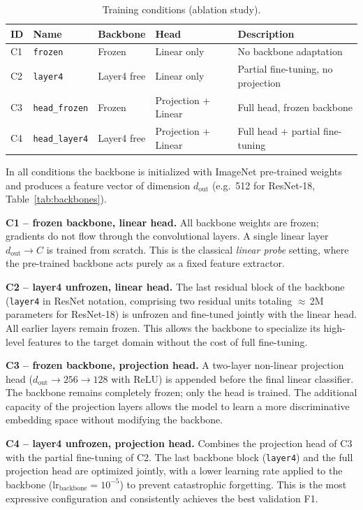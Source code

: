 \documentclass[12pt, a4paper]{article}
\begin{document}
\begin{table}[h]
\centering
\caption{Training conditions (ablation study).}
\label{tab:conditions}
\begin{tabular}{llllL{4cm}}
\toprule
\textbf{ID} & \textbf{Name} & \textbf{Backbone} & \textbf{Head} &
\textbf{Description} \\
\midrule
C1 & \texttt{frozen}       & Frozen      & Linear only         & No backbone adaptation \\
C2 & \texttt{layer4}       & Layer4 free & Linear only         & Partial fine-tuning, no projection \\
C3 & \texttt{head\_frozen} & Frozen      & Projection + Linear & Full head, frozen backbone \\
C4 & \texttt{head\_layer4} & Layer4 free & Projection + Linear & Full head + partial fine-tuning \\
\bottomrule
\end{tabular}
\end{table}

In all conditions the backbone is initialized with ImageNet pre-trained weights
and produces a feature vector of dimension $d_\text{out}$ (e.g.\ 512 for
ResNet-18, Table~\ref{tab:backbones}).

\textbf{C1 -- frozen backbone, linear head.}
All backbone weights are frozen; gradients do not flow through the convolutional
layers.
A single linear layer $d_\text{out} \to C$ is trained from scratch.
This is the classical \emph{linear probe} setting, where the pre-trained backbone
acts purely as a fixed feature extractor.

\textbf{C2 -- layer4 unfrozen, linear head.}
The last residual block of the backbone (\texttt{layer4} in ResNet notation,
comprising two residual units totaling $\approx$\,2M parameters for ResNet-18)
is unfrozen and fine-tuned jointly with the linear head.
All earlier layers remain frozen.
This allows the backbone to specialize its high-level features to the target
domain without the cost of full fine-tuning.

\textbf{C3 -- frozen backbone, projection head.}
A two-layer non-linear projection head
($d_\text{out} \!\to\! 256 \!\to\! 128$ with ReLU) is appended before the
final linear classifier.
The backbone remains completely frozen; only the head is trained.
The additional capacity of the projection layers allows the model to learn a
more discriminative embedding space without modifying the backbone.

\textbf{C4 -- layer4 unfrozen, projection head.}
Combines the projection head of C3 with the partial fine-tuning of C2.
The last backbone block (\texttt{layer4}) and the full projection head are
optimized jointly, with a lower learning rate applied to the backbone
($\text{lr}_\text{backbone} = 10^{-5}$) to prevent catastrophic forgetting.
This is the most expressive configuration and consistently achieves the best
validation F1.
\end{document}

